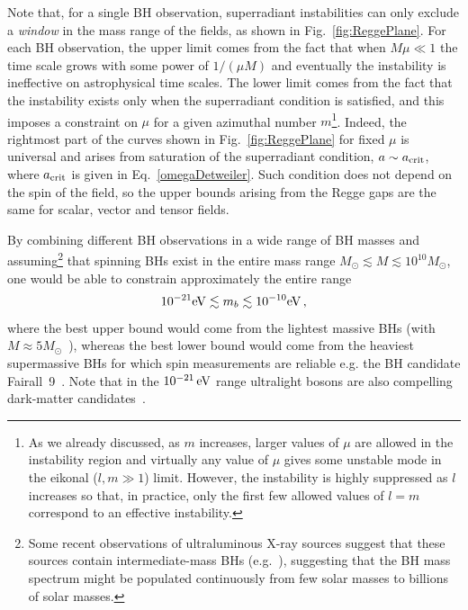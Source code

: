 \documentclass[11pt]{article}
\numberwithin{equation}{section} %
\begin{document}
Note that, for a single BH observation, superradiant instabilities can only exclude a \emph{window} in the mass range 
of the fields, as shown in Fig.~\ref{fig:ReggePlane}. For each BH observation, the upper limit comes from the fact that 
when $M\mu\ll1$ the time scale grows with some power of $1/(\mu M)$ and eventually the instability is ineffective on 
astrophysical time scales. The lower limit comes from the fact that the instability exists only when the superradiant 
condition is satisfied, and this imposes a constraint on $\mu$ for a given azimuthal number $m$\footnote{As we already 
discussed, as $m$ increases, larger values of $\mu$ are allowed in the instability region and virtually any value of 
$\mu$ gives some unstable mode in the eikonal ($l,m\gg1$) limit. However, the instability is highly suppressed as $l$ 
increases so that, in practice, only the first few allowed values of $l=m$ correspond to an effective instability.}. 
Indeed, the rightmost part of the curves shown in Fig.~\ref{fig:ReggePlane} for fixed $\mu$ is universal and arises 
from saturation of the superradiant condition, $a\sim a_{\rm crit}$, where $a_{\rm crit}$ is given in 
Eq.~\eqref{omegaDetweiler}. Such condition does not depend on the spin of the field, so the upper bounds arising from 
the Regge gaps are the same for scalar, vector and tensor fields.


By combining different BH observations in a wide 
range of BH masses and assuming\footnote{Some recent observations of ultraluminous X-ray sources suggest that these 
sources contain  intermediate-mass BHs (e.g.~\cite{2014Natur.513...74P,Lin:2018dev}), suggesting that the BH mass 
spectrum might be populated continuously from few solar masses to billions of solar masses.} that spinning BHs exist in 
the entire mass range $M_\odot\lesssim M\lesssim 10^{10} M_\odot$, one would be able to constrain approximately the entire range 
%
\begin{equation}
 10^{-21}{\rm eV}\lesssim m_b\lesssim 10^{-10}{\rm eV}\,,\label{eq_bounds_entire}
\end{equation}
%
where the best upper bound would come from the lightest massive BHs (with $M\approx 
5M_\odot$~\cite{Middleton:2015osa}), whereas the best lower bound would come from the heaviest supermassive BHs for 
which spin measurements are reliable e.g. the BH candidate Fairall~9~\cite{Schmoll:2009gq}. Note that in the 
$10^{-21}\,{\rm eV}$ range ultralight bosons are also compelling dark-matter 
candidates~\cite{Hui:2016ltb}.
\end{document}
